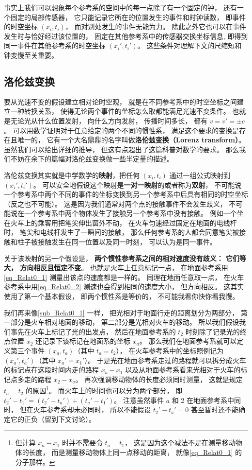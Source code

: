事实上我们可以想象每个参考系的空间中的每一点除了有一个固定的钟， 还有一个固定的局部传感器， 它只能记录它所在的位置发生的事件和时钟读数， 即事件的时空坐标 $(x_i, t_i)$， 而对别处发生的事件无能为力。 除此之外它也可以在事件发生时与恰好经过该位置的， 固定在其他参考系中的传感器交换坐标信息, 即得到同一事件在其他参考系的时空坐标 $(x_i', t_i')$。 这些条件对理解下文的尺缩短和钟变慢至关重要。

\subsection{洛伦兹变换}
要从光速不变的假设建立相对论时空观， 就是在不同参考系中的时空坐标之间建立一种转换关系， 使得无论两个事件的坐标怎么取都能满足光速不变条件。 也就是无论光从什么位置发射， 向什么方向发射， 传播时间多长， 都有 $v = v' = \pm c$。 可以用数学证明对于任意给定的两个不同的惯性系， 满足这个要求的变换是存在且唯一的， 它有一个大名鼎鼎的名字叫做\textbf{洛伦兹变换（Lorenz transform）}。 虽然我们可以给出详细的推导， 但这有点超出了这篇科普对数学的要求。 那么我们不妨在余下的篇幅对洛伦兹变换做一些半定量的描述。

洛伦兹变换其实就是中学数学的\textbf{映射}，把任何 $(x_i, t_i)$ 通过一组公式映射到 $(x_i', t_i')$。 可以安全地假设这个映射是\textbf{一对一映射}的或者称为\textbf{双射}， 不可能说一个参考系中两个不同的事件的坐标变换到另一个参考系中后具有相同的时空坐标（反之也不可能）。 这是因为我们通常对两个点的接触事件不会发生歧义， 不可能说在一个参考系中两个物体发生了接触另一个参考系中没有接触。 例如一个坐在火车上的乘客用把笔尖伸出窗外不动， 在火车匀速经过固定在地面的电线杆时， 笔尖和电线杆发生了一瞬间的接触， 那么任何参考系的人都会同意笔尖被接触和柱子被接触发生在同一位置以及同一时刻， 可以认为是同一事件。

关于该映射的另一个假设是， \textbf{两个惯性参考系之间的相对速度没有歧义： 它们等大， 方向相反且恒定不变}。 也就是火车上任意标记一点， 在地面参考系用\autoref{eq_Relat0_1} 测量出该点的速度都是一样的。 同理在地面任意取一点， 在火车参考系中用\autoref{eq_Relat0_2} 测速也会得到相同的速度大小， 但方向相反。 这其实使用了第一个基本假设， 即两个惯性系是等价的， 不可能我看你快你看我慢。

我们再来像\autoref{sub_Relat0_1} 一样， 把光相对于地面行走的距离划分为两部分， 第一部分是火车相对地面的移动， 第二部分是光相对火车的移动。 所以我们假设我们事先在火车上标记了光的出发点， 然后在地面参考系的 $t_2$ 时刻除了记录光的终点位置 $x_2$ 还记录下该标记在地面系的坐标 $x_a$。 那么我们在地面参考系就可以定义第三个事件 $(x_a, t_a)$（其中 $t_a = t_2$）， 在火车参考系中的坐标照例记为 $(x_a', t_a')$（其中 $x_a' = x_1'$）。 于是光在地面参考系走过的路程就可以拆分成火车的标记点在这段时间内走的路程 $x_a - x_1$ 以及从地面参考系看来光相对于火车的标记点多走的路程 $x_2 - x_a$。 再次强调移动物体的长度必须同时测量， 这就是规定 $t_a = t_2$ 的原因\footnote{但计算 $x_a-x_1$ 时并不需要令 $t_a = t_1$， 这是因为这个减法不是在测量移动物体的长度， 而是测量移动物体上同一点移动的距离， 就像\autoref{eq_Relat0_1} 的分子那样。}。 而火车上的时间也可以分为两个部分， 即 $t_2' - t_1' = (t_2' - t_a') + (t_a' - t_1')$。 注意虽然事件 $a$ 和 2 在地面参考系中同时， 但在火车参考系却未必同时， 所以不能假设 $t_2' - t_a' = 0$ 甚至暂时还不能确定它的正负（留到下文讨论）。

